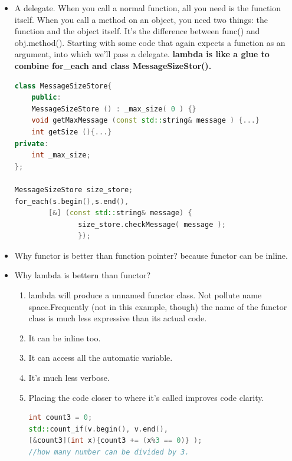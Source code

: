 \documentclass[a4paper,12pt,twoside]{book}
\begin{document}
\begin{itemize}
\item A delegate. When you call a normal function, all you need is the function itself. When you call a method on an object, you need two things: the function and the object itself. It's the difference between func() and obj.method(). Starting with some code that again expects a function as an argument, into which we'll pass a delegate. \textbf{lambda is like a glue to combine for\_each and class MessageSizeStor().}

\begin{lstlisting}[frame=single, language=c++]
class MessageSizeStore{
    public:
    MessageSizeStore () : _max_size( 0 ) {}
    void getMaxMessage (const std::string& message ) {...}
    int getSize (){...}
private:
    int _max_size;
};

MessageSizeStore size_store;
for_each(s.begin(),s.end(),
        [&] (const std::string& message) {
               size_store.checkMessage( message );
               });
\end{lstlisting}

\item Why functor is better than function pointer? because functor can be inline. 

\item Why lambda is bettern than functor? 
\begin{enumerate}
\item lambda will produce a unnamed functor class. Not pollute name space.Frequently (not in this example, though) the name of the functor class is much less expressive than its actual code.
\item It can be inline too.
\item It can access all the automatic variable.
\item It's much less verbose.
\item Placing the code closer to where it's called improves code clarity.
\begin{lstlisting}[frame=single, language=c++]
int count3 = 0;
std::count_if(v.begin(), v.end(),
[&count3](int x){count3 += (x%3 == 0)} );
//how many number can be divided by 3.
\end{lstlisting}
\end{enumerate}


\end{itemize}
\end{document}
